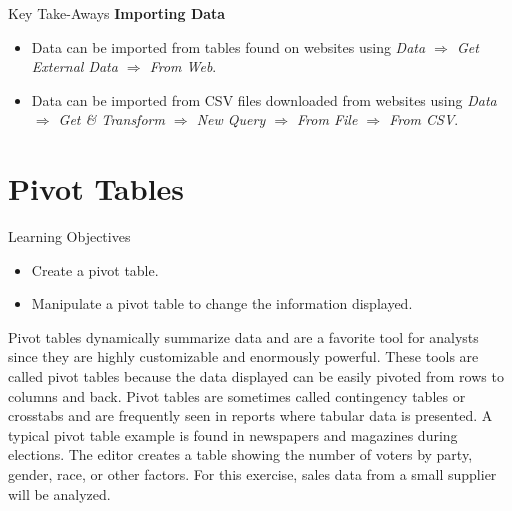 \begin{center}
	\begin{tkwbox}{Key Take-Aways}
		\textbf{Importing Data}
		\\
		\begin{itemize}
			\setlength{\itemsep}{0pt}
			\setlength{\parskip}{0pt}
			\setlength{\parsep}{0pt}
			
			\item Data can be imported from tables found on websites using \textit{Data $ \Rightarrow $ Get External Data $ \Rightarrow $ From Web}. 
			\item Data can be imported from CSV files downloaded from websites using \textit{Data $ \Rightarrow $ Get \& Transform $ \Rightarrow $ New Query $ \Rightarrow $ From File $ \Rightarrow $ From CSV}.
			
		\end{itemize}
	\end{tkwbox}
\end{center}

\section{Pivot Tables}

\begin{center}
	\begin{objbox}{Learning Objectives}
		\begin{itemize}
			\setlength{\itemsep}{0pt}
			\setlength{\parskip}{0pt}
			\setlength{\parsep}{0pt}

			\item Create a pivot table.
			\item Manipulate a pivot table to change the information displayed.
			
		\end{itemize}
	\end{objbox}
\end{center}

Pivot tables dynamically summarize data and are a favorite tool for analysts since they are highly customizable and enormously powerful. These tools are called pivot tables because the data displayed can be easily pivoted from rows to columns and back. Pivot tables are sometimes called contingency tables or crosstabs and are frequently seen in reports where tabular data is presented. A typical pivot table example is found in newspapers and magazines during elections. The editor creates a table showing the number of voters by party, gender, race, or other factors. For this exercise, sales data from a small supplier will be analyzed.

